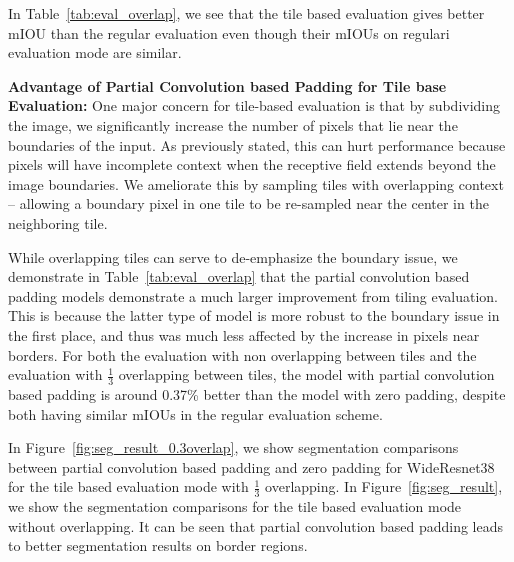 \documentclass[10pt,twocolumn,letterpaper]{article}
\begin{document}
In Table~\ref{tab:eval_overlap}, we see that the tile based evaluation gives better mIOU than the regular evaluation even though their mIOUs on regulari evaluation mode are similar.

\textbf{Advantage of Partial Convolution based Padding for Tile base Evaluation:} One major concern for tile-based evaluation is that by subdividing the image, we significantly increase the number of pixels that lie near the boundaries of the input. As previously stated, this can hurt performance because pixels will have incomplete context when the receptive field extends beyond the image boundaries. We ameliorate this by sampling tiles with overlapping context -- allowing a boundary pixel in one tile to be re-sampled near the center in the neighboring tile. 

While overlapping tiles can serve to de-emphasize the boundary issue, we demonstrate in Table~\ref{tab:eval_overlap} that the partial convolution based padding models demonstrate a much larger improvement from tiling evaluation. This is because the latter type of model is more robust to the boundary issue in the first place, and thus was much less affected by the increase in pixels near borders. For both the evaluation with non overlapping between tiles and the evaluation with $\frac{1}{3}$ overlapping between tiles, the model with partial convolution based padding is around 0.37\% better than the model with zero padding, despite both having similar mIOUs in the regular evaluation scheme. 


In Figure~\ref{fig:seg_result_0.3overlap}, we show segmentation comparisons between partial convolution based padding and zero padding for WideResnet38 for the tile based evaluation mode with $\frac{1}{3}$ overlapping. In Figure~\ref{fig:seg_result}, we show the segmentation comparisons for the tile based evaluation mode without overlapping. It can be seen that partial convolution based padding leads to better segmentation results on border regions.
\end{document}
